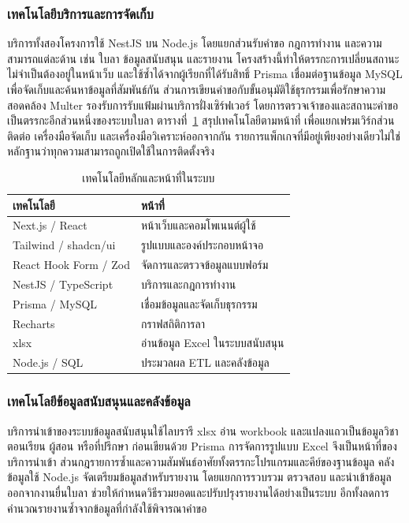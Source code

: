 \subsubsection{เทคโนโลยีบริการและการจัดเก็บ}
บริการทั้งสองโครงการใช้ NestJS บน Node.js โดยแยกส่วนรับคำขอ
กฎการทำงาน และความสามารถแต่ละด้าน เช่น ใบลา ข้อมูลสนับสนุน และรายงาน
โครงสร้างนี้ทำให้ตรรกะการเปลี่ยนสถานะไม่จำเป็นต้องอยู่ในหน้าเว็บ
และใช้ซ้ำได้จากผู้เรียกที่ได้รับสิทธิ์
Prisma เชื่อมต่อฐานข้อมูล MySQL
เพื่อจัดเก็บและค้นหาข้อมูลที่สัมพันธ์กัน
ส่วนการเขียนคำขอกับขั้นอนุมัติใช้ธุรกรรมเพื่อรักษาความสอดคล้อง Multer
รองรับการรับแฟ้มผ่านบริการฝั่งเซิร์ฟเวอร์
โดยการตรวจเจ้าของและสถานะคำขอเป็นตรรกะอีกส่วนหนึ่งของระบบใบลา
ตารางที่~\ref{tab:tech-stack} สรุปเทคโนโลยีตามหน้าที่
เพื่อแยกเฟรมเวิร์กส่วนติดต่อ เครื่องมือจัดเก็บ
และเครื่องมือวิเคราะห์ออกจากกัน
รายการแพ็กเกจที่มีอยู่เพียงอย่างเดียวไม่ใช่หลักฐานว่าทุกความสามารถถูกเปิดใช้ในการติดตั้งจริง
\begin{table}[H]
  \caption{เทคโนโลยีหลักและหน้าที่ในระบบ}\label{tab:tech-stack}
  \centering
  \begin{tabularx}{\columnwidth}{|p{30mm}|X|}
    \hline
    เทคโนโลยี & หน้าที่ \\ \hline
    Next.js / React & หน้าเว็บและคอมโพเนนต์ผู้ใช้ \\ \hline
    Tailwind / shadcn/ui & รูปแบบและองค์ประกอบหน้าจอ \\ \hline
    React Hook Form / Zod & จัดการและตรวจข้อมูลแบบฟอร์ม \\ \hline
    NestJS / TypeScript & บริการและกฎการทำงาน \\ \hline
    Prisma / MySQL & เชื่อมข้อมูลและจัดเก็บธุรกรรม \\ \hline
    Recharts & กราฟสถิติการลา \\ \hline
    xlsx & อ่านข้อมูล Excel ในระบบสนับสนุน \\ \hline
    Node.js / SQL & ประมวลผล ETL และคลังข้อมูล \\ \hline
  \end{tabularx}
\end{table}
\subsubsection{เทคโนโลยีข้อมูลสนับสนุนและคลังข้อมูล}
บริการนำเข้าของระบบข้อมูลสนับสนุนใช้ไลบรารี xlsx อ่าน workbook
และแปลงแถวเป็นข้อมูลวิชา ตอนเรียน ผู้สอน หรือที่ปรึกษา ก่อนเขียนด้วย
Prisma การจัดการรูปแบบ Excel จึงเป็นหน้าที่ของบริการนำเข้า
ส่วนกฎรายการซ้ำและความสัมพันธ์อาศัยทั้งตรรกะโปรแกรมและคีย์ของฐานข้อมูล
คลังข้อมูลใช้ Node.js จัดเตรียมข้อมูลสำหรับรายงาน โดยแยกการรวบรวม
ตรวจสอบ และนำเข้าข้อมูลออกจากงานยื่นใบลา
ช่วยให้กำหนดวิธีรวมยอดและปรับปรุงรายงานได้อย่างเป็นระบบ
อีกทั้งลดการคำนวณรายงานซ้ำจากข้อมูลที่กำลังใช้พิจารณาคำขอ
